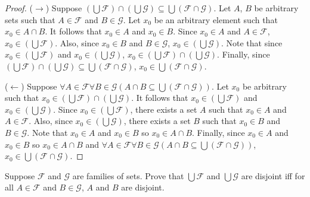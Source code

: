 \begin{proof}
    ($\rightarrow$) Suppose $(\bigcup \mathcal{F}) \cap (\bigcup \mathcal{G}) \subseteq \bigcup(\mathcal{F} \cap \mathcal{G})$.
    Let $A$, $B$ be arbitrary sets such that $A \in \mathcal{F}$ and $B \in \mathcal{G}$.
    Let $x_0$ be an arbitrary element such that $x_0 \in A \cap B$.
    It follows that $x_0 \in A$ and $x_0 \in B$.
    Since $x_0 \in A$ and $A \in \mathcal{F}$, $x_0 \in (\bigcup \mathcal{F})$.
    Also, since $x_0 \in B$ and $B \in \mathcal{G}$, $x_0 \in (\bigcup \mathcal{G})$.
    Note that since $x_0 \in (\bigcup \mathcal{F})$ and $x_0 \in (\bigcup \mathcal{G})$,
    $x_0 \in (\bigcup \mathcal{F}) \cap (\bigcup \mathcal{G})$.
    Finally, since $(\bigcup \mathcal{F}) \cap (\bigcup \mathcal{G}) \subseteq \bigcup(\mathcal{F} \cap \mathcal{G})$,
    $x_0 \in \bigcup(\mathcal{F} \cap \mathcal{G})$.

    ($\leftarrow$) Suppose $\forall{A} \in \mathcal{F}\forall{B}
        \in \mathcal{G}(A \cap B \subseteq \bigcup(\mathcal{F} \cap \mathcal{G}))$.
    Let $x_0$ be arbitrary such that $x_0 \in (\bigcup \mathcal{F}) \cap (\bigcup \mathcal{G})$.
    It follows that $x_0 \in (\bigcup \mathcal{F})$ and $x_0 \in (\bigcup \mathcal{G})$.
    Since $x_0 \in (\bigcup \mathcal{F})$, 
    there exists a set $A$ such that $x_0 \in A$ and $A \in \mathcal{F}$.
    Also, since $x_0 \in (\bigcup \mathcal{G})$, 
    there exists a set $B$ such that $x_0 \in B$ and $B \in \mathcal{G}$.
    Note that $x_0 \in A$ and $x_0 \in B$ so $x_0 \in A \cap B$.
    Finally, since $x_0 \in A$ and $x_0 \in B$ so $x_0 \in A \cap B$ and $\forall{A} \in \mathcal{F}\forall{B}
        \in \mathcal{G}(A \cap B \subseteq \bigcup(\mathcal{F} \cap \mathcal{G}))$,
    $x_0 \in \bigcup(\mathcal{F} \cap \mathcal{G})$.
\end{proof}

\begin{tcolorbox}[title=Problem 20, breakable]
    Suppose $\mathcal{F}$ and $\mathcal{G}$ are families of sets. Prove that $\bigcup \mathcal{F}$ and $\bigcup \mathcal{G}$
    are disjoint iff for all $A \in \mathcal{F}$ and $B \in \mathcal{G}$, $A$ and $B$ are disjoint.
\end{tcolorbox}


